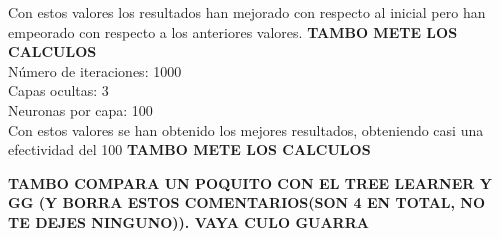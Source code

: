\documentclass[10pt,a4paper]{article}
\begin{document}
Con estos valores los resultados han mejorado con respecto al inicial pero han empeorado con respecto a los anteriores valores.
\textbf{TAMBO METE LOS CALCULOS}\\
Número de iteraciones: 1000 \\
Capas ocultas: 3  \\
Neuronas por capa: 100 \\ 

Con estos valores se han obtenido los mejores resultados, obteniendo casi una efectividad del 100%
\textbf{TAMBO METE LOS CALCULOS}


\textbf{TAMBO COMPARA UN POQUITO CON EL TREE LEARNER Y GG (Y BORRA ESTOS COMENTARIOS(SON 4 EN TOTAL, NO TE DEJES NINGUNO)). VAYA CULO GUARRA}
\end{document}
